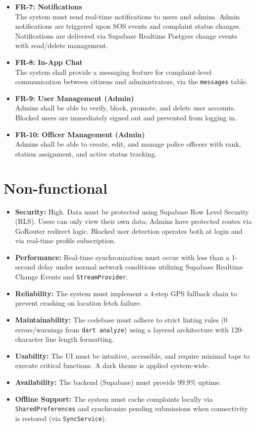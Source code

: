 \documentclass[12pt, a4paper, twoside]{report}
\begin{document}
\begin{itemize}
    \item \textbf{FR-7: Notifications}\\
    The system must send real-time notifications to users and admins. Admin notifications are triggered upon SOS events and complaint status changes. Notifications are delivered via Supabase Realtime Postgres change events with read/delete management.
    \item \textbf{FR-8: In-App Chat}\\
    The system shall provide a messaging feature for complaint-level communication between citizens and administrators, via the \texttt{messages} table.
    \item \textbf{FR-9: User Management (Admin)}\\
    Admins shall be able to verify, block, promote, and delete user accounts. Blocked users are immediately signed out and prevented from logging in.
    \item \textbf{FR-10: Officer Management (Admin)}\\
    Admins shall be able to create, edit, and manage police officers with rank, station assignment, and active status tracking.
\end{itemize}
\section{Non-functional}
\begin{itemize}
    \item \textbf{Security:} High. Data must be protected using Supabase Row Level Security (RLS). Users can only view their own data; Admins have protected routes via GoRouter redirect logic. Blocked user detection operates both at login and via real-time profile subscription.
    \item \textbf{Performance:} Real-time synchronization must occur with less than a 1-second delay under normal network conditions utilizing Supabase Realtime Change Events and \texttt{StreamProvider}.
    \item \textbf{Reliability:} The system must implement a 4-step GPS fallback chain to prevent crashing on location fetch failure.
    \item \textbf{Maintainability:} The codebase must adhere to strict linting rules (0 errors/warnings from \texttt{dart analyze}) using a layered architecture with 120-character line length formatting.
    \item \textbf{Usability:} The UI must be intuitive, accessible, and require minimal taps to execute critical functions. A dark theme is applied system-wide.
    \item \textbf{Availability:} The backend (Supabase) must provide 99.9\% uptime.
    \item \textbf{Offline Support:} The system must cache complaints locally via \texttt{SharedPreferences} and synchronize pending submissions when connectivity is restored (via \texttt{SyncService}).
\end{itemize}
\end{document}
